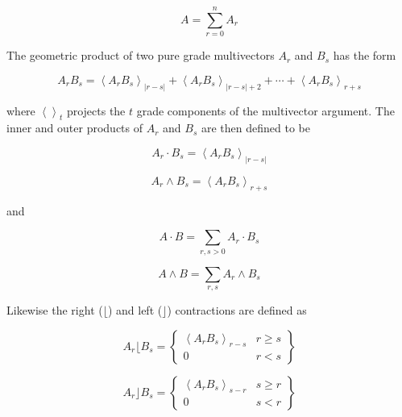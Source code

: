 \documentclass[12pt]{report}
\newcommand{\llt}{\left <}
\newcommand{\rgt}{\right >}
\newcommand{\abs}[1]{\left |{#1}\right |}
\newcommand{\proj}[2]{\llt {#1} \rgt_{#2}}
\begin{document}
  \begin{equation}
  A = \sum_{r = 0}^{n}A_{r}
  \end{equation}

The geometric product of two pure grade multivectors $A_{r}$ and
$B_{s}$ has the form

  \begin{equation}
  A_{r}B_{s} = \proj{A_{r}B_{s}}{\abs{r-s}}+\proj{A_{r}B_{s}}{\abs{r-s}+2}+\cdots+\proj{A_{r}B_{s}}{r+s}
  \end{equation}

where $\proj{}{t}$ projects the $t$ grade components of the
multivector argument.  The inner and outer products of $A_{r}$ and
$B_{s}$ are then defined to be

  \begin{equation}
  A_{r}\cdot B_{s} = \proj{A_{r}B_{s}}{\abs{r-s}}
  \end{equation}

  \begin{equation}
  A_{r}\wedge B_{s} = \proj{A_{r}B_{s}}{r+s}
  \end{equation}

and

  \begin{equation}
  A\cdot B = \sum_{r,s>0}A_{r}\cdot B_{s}
  \end{equation}

  \begin{equation}
  A\wedge B = \sum_{r,s}A_{r}\wedge B_{s}
  \end{equation}

Likewise the right ($\lfloor$) and left ($\rfloor$) contractions are defined as

  \begin{equation}
  A_{r}\lfloor B_{s} = \left \{ \begin{array}{cc}
     \proj{A_{r}B_{s}}{r-s} &  r \ge s \\
               0            &  r < s \end{array} \right \}
  \end{equation}

  \begin{equation}
  A_{r}\rfloor B_{s} = \left \{ \begin{array}{cc}
     \proj{A_{r}B_{s}}{s-r} &  s \ge r \\
               0            &  s < r \end{array} \right \}
  \end{equation}
\end{document}
